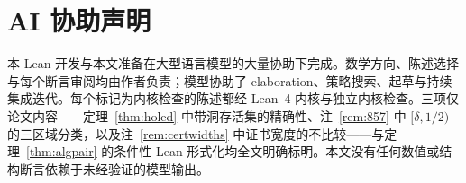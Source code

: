 \documentclass[11pt,a4paper]{article}
\theoremstyle{remark}
\begin{document}
\section{AI 协助声明}
\label{sec:ai}

本 Lean 开发与本文准备在大型语言模型的大量协助下完成。数学方向、陈述选择与每个断言审阅均由作者负责；模型协助了 elaboration、策略搜索、起草与持续集成迭代。每个标记为内核检查的陈述都经 Lean~4 内核与独立内核检查。三项仅论文内容——定理~\ref{thm:holed} 中带洞存活集的精确性、注~\ref{rem:857} 中 $[\delta,1/2)$ 的三区域分类，以及注~\ref{rem:certwidths} 中证书宽度的不比较——与定理~\ref{thm:algpair} 的条件性 Lean 形式化均全文明确标明。本文没有任何数值或结构断言依赖于未经验证的模型输出。


\end{document}
